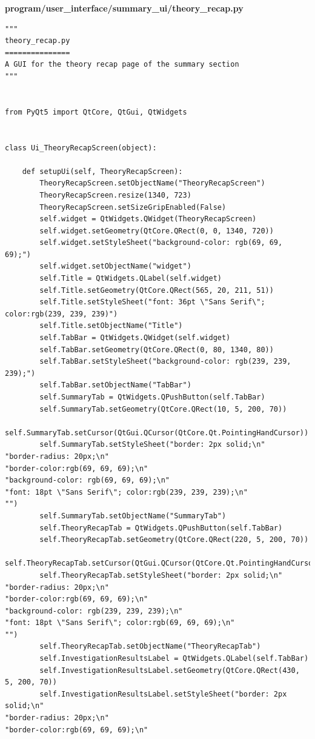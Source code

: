 \documentclass[12pt]{article}
\begin{document}
\textbf{program/user\_interface/summary\_ui/theory\_recap.py}
\begin{lstlisting}
"""
theory_recap.py
===============
A GUI for the theory recap page of the summary section
"""


from PyQt5 import QtCore, QtGui, QtWidgets


class Ui_TheoryRecapScreen(object):

    def setupUi(self, TheoryRecapScreen):
        TheoryRecapScreen.setObjectName("TheoryRecapScreen")
        TheoryRecapScreen.resize(1340, 723)
        TheoryRecapScreen.setSizeGripEnabled(False)
        self.widget = QtWidgets.QWidget(TheoryRecapScreen)
        self.widget.setGeometry(QtCore.QRect(0, 0, 1340, 720))
        self.widget.setStyleSheet("background-color: rgb(69, 69, 69);")
        self.widget.setObjectName("widget")
        self.Title = QtWidgets.QLabel(self.widget)
        self.Title.setGeometry(QtCore.QRect(565, 20, 211, 51))
        self.Title.setStyleSheet("font: 36pt \"Sans Serif\"; color:rgb(239, 239, 239)")
        self.Title.setObjectName("Title")
        self.TabBar = QtWidgets.QWidget(self.widget)
        self.TabBar.setGeometry(QtCore.QRect(0, 80, 1340, 80))
        self.TabBar.setStyleSheet("background-color: rgb(239, 239, 239);")
        self.TabBar.setObjectName("TabBar")
        self.SummaryTab = QtWidgets.QPushButton(self.TabBar)
        self.SummaryTab.setGeometry(QtCore.QRect(10, 5, 200, 70))
        self.SummaryTab.setCursor(QtGui.QCursor(QtCore.Qt.PointingHandCursor))
        self.SummaryTab.setStyleSheet("border: 2px solid;\n"
"border-radius: 20px;\n"
"border-color:rgb(69, 69, 69);\n"
"background-color: rgb(69, 69, 69);\n"
"font: 18pt \"Sans Serif\"; color:rgb(239, 239, 239);\n"
"")
        self.SummaryTab.setObjectName("SummaryTab")
        self.TheoryRecapTab = QtWidgets.QPushButton(self.TabBar)
        self.TheoryRecapTab.setGeometry(QtCore.QRect(220, 5, 200, 70))
        self.TheoryRecapTab.setCursor(QtGui.QCursor(QtCore.Qt.PointingHandCursor))
        self.TheoryRecapTab.setStyleSheet("border: 2px solid;\n"
"border-radius: 20px;\n"
"border-color:rgb(69, 69, 69);\n"
"background-color: rgb(239, 239, 239);\n"
"font: 18pt \"Sans Serif\"; color:rgb(69, 69, 69);\n"
"")
        self.TheoryRecapTab.setObjectName("TheoryRecapTab")
        self.InvestigationResultsLabel = QtWidgets.QLabel(self.TabBar)
        self.InvestigationResultsLabel.setGeometry(QtCore.QRect(430, 5, 200, 70))
        self.InvestigationResultsLabel.setStyleSheet("border: 2px solid;\n"
"border-radius: 20px;\n"
"border-color:rgb(69, 69, 69);\n"

\end{lstlisting}
\end{document}
